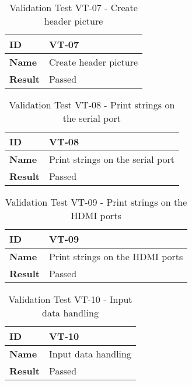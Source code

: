 \begin{table}[H]
    \centering
    \begin{tabular}{| p{3cm} | p{7cm} |}
    \hline
    \textbf{ID}             & VT-07 \\ \hline
    \textbf{Name}           & Create header picture\\ \hline
    \textbf{Result}         & \textcolor{mygreen}{Passed}\\ \hline
    \end{tabular}
    \caption{Validation Test VT-07 - Create header picture}
\end{table}

\begin{table}[H]
    \centering
    \begin{tabular}{| p{3cm} | p{7cm} |}
    \hline
    \textbf{ID}             & VT-08 \\ \hline
    \textbf{Name}           & Print strings on the serial port\\ \hline
    \textbf{Result}         & \textcolor{mygreen}{Passed}\\ \hline
    \end{tabular}
    \caption{Validation Test VT-08 - Print strings on the serial port}
\end{table}

\begin{table}[H]
    \centering
    \begin{tabular}{| p{3cm} | p{7cm} |}
    \hline
    \textbf{ID}             & VT-09 \\ \hline
    \textbf{Name}           & Print strings on the HDMI ports\\ \hline
    \textbf{Result}         & \textcolor{mygreen}{Passed}\\ \hline
    \end{tabular}
    \caption{Validation Test VT-09 - Print strings on the HDMI ports}
\end{table}

\begin{table}[H]
    \centering
    \begin{tabular}{| p{3cm} | p{7cm} |}
    \hline
    \textbf{ID}             & VT-10 \\ \hline
    \textbf{Name}           & Input data handling\\ \hline
    \textbf{Result}         & \textcolor{mygreen}{Passed}\\ \hline
    \end{tabular}
    \caption{Validation Test VT-10 - Input data handling}
\end{table}

